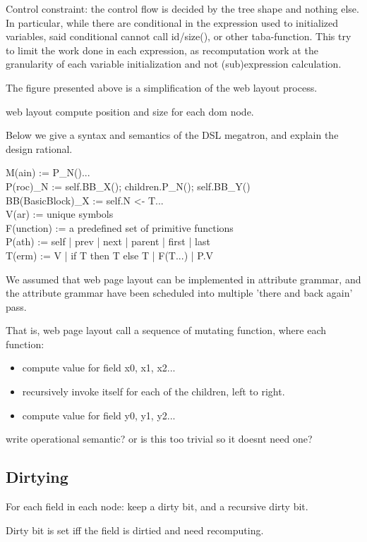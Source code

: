 \documentclass[format=acmsmall, review=false, screen=true]{acmart}
\begin{document}
Control constraint: the control flow is decided by the tree shape and nothing else. In particular, while there are conditional in the expression used to initialized variables, said conditional cannot call id/size(), or other taba-function. This try to limit the work done in each expression, as recomputation work at the granularity of each variable initialization and not (sub)expression calculation.

The figure presented above is a simplification of the web layout process. 

web layout compute position and size for each dom node.


Below we give a syntax and semantics of the DSL megatron, and explain the design rational.

M(ain) := P\_N()... \\
P(roc)\_N := self.BB\_X(); children.P\_N(); self.BB\_Y() \\
BB(BasicBlock)\_X := self.N <- T... \\
V(ar) := unique symbols \\
F(unction) := a predefined set of primitive functions \\
P(ath) := self | prev | next | parent | first | last \\
T(erm) := V | if T then T else T | F(T...) | P.V

We assumed that web page layout can be implemented in attribute grammar, and the attribute grammar have been scheduled into multiple 'there and back again' pass.

That is, web page layout call a sequence of mutating function, where each function:
\begin{itemize}
	\item compute value for field x0, x1, x2...
	\item recursively invoke itself for each of the children, left to right.
	\item compute value for field y0, y1, y2...
\end{itemize}

write operational semantic? or is this too trivial so it doesnt need one?

\subsection{Dirtying}

For each field in each node: keep a dirty bit, and a recursive dirty bit.

Dirty bit is set iff the field is dirtied and need recomputing.
\end{document}
